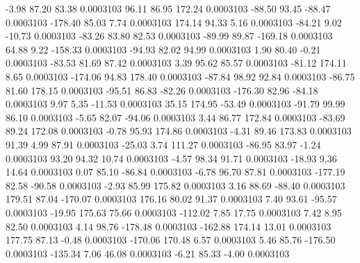        -3.98       87.20       83.38     0.0003103
       96.11       86.95      172.24     0.0003103
      -88.50       93.45      -88.47     0.0003103
     -178.40       85.03        7.74     0.0003103
      174.14       94.33        5.16     0.0003103
      -84.21        9.02      -10.73     0.0003103
      -83.26       83.80       82.53     0.0003103
      -89.99       89.87     -169.18     0.0003103
       64.88        9.22     -158.33     0.0003103
      -94.93       82.02       94.99     0.0003103
        1.90       80.40       -0.21     0.0003103
      -83.53       81.69       87.42     0.0003103
        3.39       95.62       85.57     0.0003103
      -81.12      174.11        8.65     0.0003103
     -174.06       94.83      178.40     0.0003103
      -87.84       98.92       92.84     0.0003103
      -86.75       81.60      178.15     0.0003103
      -95.51       86.83      -82.26     0.0003103
     -176.30       82.96      -84.18     0.0003103
        9.97        5.35      -11.53     0.0003103
       35.15      174.95      -53.49     0.0003103
      -91.79       99.99       86.10     0.0003103
       -5.65       82.07      -94.06     0.0003103
        3.44       86.77      172.84     0.0003103
      -83.69       89.24      172.08     0.0003103
       -0.78       95.93      174.86     0.0003103
       -4.31       89.46      173.83     0.0003103
       91.39        4.99       87.91     0.0003103
      -25.03        3.74      111.27     0.0003103
      -86.95       83.97       -1.24     0.0003103
       93.20       94.32       10.74     0.0003103
       -4.57       98.34       91.71     0.0003103
      -18.93        9.36       14.64     0.0003103
        0.07       85.10      -86.84     0.0003103
       -6.78       96.70       87.81     0.0003103
     -177.19       82.58      -90.58     0.0003103
       -2.93       85.99      175.82     0.0003103
        3.16       88.69      -88.40     0.0003103
      179.51       87.04     -170.07     0.0003103
      176.16       80.02       91.37     0.0003103
        7.40       93.61      -95.57     0.0003103
      -19.95      175.63       75.66     0.0003103
     -112.02        7.85       17.75     0.0003103
        7.42        8.95       82.50     0.0003103
        4.14       98.76     -178.48     0.0003103
     -162.88      174.14       13.01     0.0003103
      177.75       87.13       -0.48     0.0003103
     -170.06      170.48        6.57     0.0003103
        5.46       85.76     -176.50     0.0003103
     -135.34        7.06       46.08     0.0003103
       -6.21       85.33       -4.00     0.0003103
